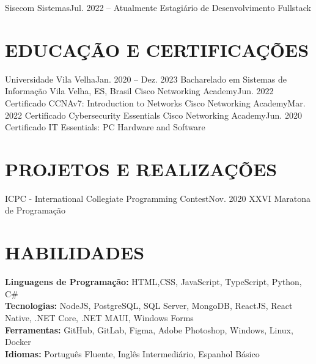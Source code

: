 \resumeSubheading
{Sisecom Sistemas}{Jul. 2022 -- Atualmente}
{Estagiário de Desenvolvimento Fullstack}{}
\resumeItemListStart
{}
\resumeItemListEnd

\resumeSubHeadingListEnd

\section {EDUCAÇÃO E CERTIFICAÇÕES}
\resumeSubHeadingListStart
\resumeSubheading
{Universidade Vila Velha}{Jan. 2020 -- Dez. 2023}
{Bacharelado em Sistemas de Informação}
{Vila Velha, ES, Brasil}
\resumeSubHeadingListEnd
\resumeSubHeadingListStart
\resumeSubheading
{Cisco Networking Academy}{Jun. 2022}
{Certificado CCNAv7: Introduction to Networks}{}
\resumeSubheading
{Cisco Networking Academy}{Mar. 2022}
{Certificado Cybersecurity Essentials}{}
\resumeSubheading
{Cisco Networking Academy}{Jun. 2020}
{Certificado IT Essentials: PC Hardware and Software}{}
\resumeSubHeadingListEnd

\section{PROJETOS E REALIZAÇÕES}
\resumeSubHeadingListStart
\resumeSubheading
{ICPC - International Collegiate Programming Contest}{Nov. 2020}
{XXVI Maratona de Programação}{}
          
\resumeSubHeadingListEnd

\section{HABILIDADES}
\begin{itemize}[leftmargin=0in, label={}]
	\small{\item{
		\textbf{Linguagens de Programação:}
		{HTML,CSS, JavaScript, TypeScript, Python, C\#}
		\vspace{2pt} \\

    \textbf{Tecnologias:}
		{NodeJS, PostgreSQL, SQL Server, MongoDB, ReactJS, React Native, .NET Core, .NET MAUI, Windows Forms}
		\vspace{2pt} \\
		     
		\textbf{Ferramentas:}
		{GitHub, GitLab, Figma, Adobe Photoshop, Windows, Linux, Docker}
		\vspace{2pt} \\
		     
		\textbf{Idiomas:}
		{Português Fluente, Inglês Intermediário, Espanhol Básico}
	}}
\end{itemize}
